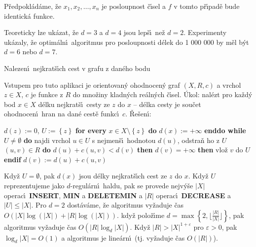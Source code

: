 \flushpar P\v redpokl\'ad\'ame, \v ze $x_1,x_2,\dots,x_n$ je posloupnost 
\v c\'\i sel a $f$ v tomto p\v r\'\i pad\v e bude identick\'a funkce.
\medskip

\flushpar Teoreticky lze uk\'azat, \v ze $d=3$ a $d=4$ jsou lep\v s\'\i\ ne\v z 
$d=2$.  Experimenty uk\'azaly, \v ze optim\'aln\'\i\ algoritmus pro 
posloupnosti d\'elek do 1 000 000 by m\v el b\'yt $d=6$ nebo $d=7$.  
\medskip

\subhead
Nalezen\'\i\ nejkrat\v s\'\i ch cest v grafu z dan\'eho 
bodu
\endsubhead
\smallskip
 
\flushpar Vstupem pro tuto aplikaci je orientovan\'y ohodnocen\'y graf $\left(X,R,c\right)$ a 
vrchol $z\in X$, $c$ je funkce z $R$ do mno\v ziny kladn\'ych 
re\'aln\'ych \v c\'\i sel.\newline 
\'Ukol: nal\'ezt pro ka\v zd\'y bod $x\in X$ d\'elku 
nejkrat\v s\'\i\ cesty ze $z$ do $x$ -- d\'elka cesty je sou\v cet 
ohodnocen\'\i\ hran na dan\'e cest\v e funkc\'\i\ $c$.\newline 
\v Re\v sen\'\i: 
\bigskip

$d\left(z\right):=0$, $U:=\left\{z\right\}$\newline
{\bf for every} $x\in X\setminus \left\{z\right\}$ {\bf do} $d\left(x\right):=+\infty$ {\bf enddo\newline
while} $U\ne\emptyset$ {\bf do\newline}
\phantom{---}najdi vrchol $u\in U$ s nejmen\v s\'\i\ hodnotou $d\left(u\right)$, odstra\v n ho z $
U$\newline
\phantom{---}{\bf for every} $\left(u,v\right)\in R$ {\bf do\newline}
\phantom{------}{\bf if} $d\left(u\right)+c\left(u,v\right)<d\left(v\right)$ {\bf then}\newline 
\phantom{---------}{\bf if} $d\left(v\right)=+\infty$ {\bf then} vlo\v z $v$ do $U$ {\bf endif}\newline 
\phantom{---------}$d\left(v\right):=d\left(u\right)+c\left(u,v\right)$\newline 
\phantom{------}{\bf endif}\newline 
\phantom{---}{\bf enddo\newline 
enddo}
\medskip

\flushpar Kdy\v z $U=\emptyset$, pak $d\left(x\right)$ jsou d\'elky nejkrat\v s\'\i ch cest ze $
z$ do $x$.
Kdy\v z $U$ reprezentujeme jako $d$-regul\'arn\'\i\ haldu, pak 
se provede nejv\'y\v se $|X|$ operac\'\i\ {\bf INSERT}, {\bf MIN} a {\bf DELETEMIN }
a $|R|$ operac\'\i\ {\bf DECREASE} a $|U|\le |X|$. Pro $d=2$ dost\'av\'ame, 
\v ze algoritmus vy\v zaduje \v cas $O\left(|X|\log\left(|X|\right)+|R|\log\left(|X|\right)\right)$. kdy\v z polo\v z\'\i me  
$d=\max\left\{2,\lfloor\frac {|R|}{|X|}\rfloor \right\}$, pak algoritmus vy\v zaduje \v cas $
O\left(|R|\log_d|X|\right)$.
Kdy\v z $|R|>|X|^{1+\varepsilon}$ pro $\varepsilon >0$, pak $\log_
d|X|=O\left(1\right)$ a algoritmus 
je line\'arn\'\i\ (tj. vy\v zaduje \v cas $O\left(|R|\right)$).


